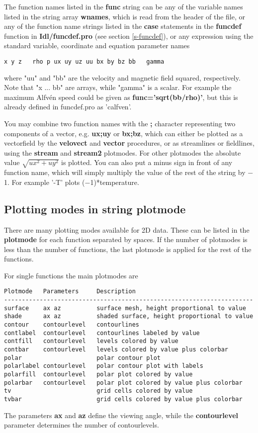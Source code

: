    The function names listed in the {\bf func} string can be any of 
   the variable names listed in the string array {\bf wnames}, which is 
   read from the header of the file, or any of the function name strings 
   listed in the {\bf case} statements in the {\bf funcdef} 
   function in {\bf Idl/funcdef.pro} (see section \ref{s-funcdef}), 
   or any expression using the standard variable, 
   coordinate and equation parameter names 
\begin{verbatim}
x y z   rho p ux uy uz uu bx by bz bb   gamma
\end{verbatim}
   where "uu" and "bb" are the velocity and magnetic field squared, 
   respectively. Note that "x ... bb" are arrays, while  "gamma" is
   a scalar. For example the maximum Alfv\'en 
   speed could be given as {\bf func='sqrt(bb/rho)'}, but this is already 
   defined in funcdef.pro as 'calfven'.

   You may combine two function names with the {\bf ;} character representing
   two components of a vector, 
   e.g. {\bf ux;uy} or {\bf bx;bz}, which can either be plotted as a 
   vectorfield by the {\bf velovect} and {\bf vector} procedures, 
   or as streamlines or fieldlines, using the 
   {\bf stream} and {\bf stream2} plotmodes.
   For other plotmodes the absolute value
   $\sqrt{ux^2+uy^2}$ is plotted.
   You can also put a minus sign in front of any function name, which
   will simply multiply the value of the rest of the string by $-$1. 
   For example '-T' plots ($-$1)*temperature.


\subsection{Plotting modes in string plotmode \label{s-plotmode}}

   There are many plotting modes available for 2D data. These can be
   listed in the {\bf plotmode} for each function separated by spaces.
   If the number of plotmodes is less than the number of functions,
   the last plotmode is applied for the rest of the functions.

   For single functions the main plotmodes are 
\begin{verbatim}
Plotmode   Parameters     Description
----------------------------------------------------------------------
surface    ax az          surface mesh, height proportional to value
shade      ax az          shaded surface, height proportional to value
contour    contourlevel   contourlines
contlabel  contourlevel   contourlines labeled by value
contfill   contourlevel   levels colored by value
contbar    contourlevel   levels colored by value plus colorbar
polar                     polar contour plot
polarlabel contourlevel   polar contour plot with labels
polarfill  contourlevel   polar plot colored by value
polarbar   contourlevel   polar plot colored by value plus colorbar
tv                        grid cells colored by value
tvbar                     grid cells colored by value plus colorbar
\end{verbatim}
   The parameters {\bf ax} and {\bf az} define the viewing angle,
   while the {\bf contourlevel} parameter 
   determines the number of contourlevels.

